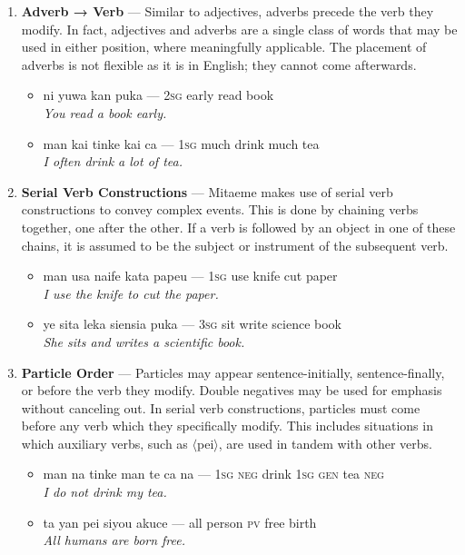 \documentclass[a4paper, titlepage]{article}
\begin{document}
\begin{enumerate}
	\begin{itemize}
		\item ni te pueno ca citala — \textsc{2sg} \textsc{gen} good tea cold\\\textit{Your good tea is cold.}
		\item ni te ca ke man tinke pueno — \textsc{2sg gen} tea \textsc{rel 1sg} drink good\\\textit{Your tea I am drinking is good.}
	\end{itemize}
	\item \textbf{Adverb → Verb} — Similar to adjectives, adverbs precede the verb they modify. In fact, adjectives and adverbs are a single class of words that may be used in either position, where meaningfully applicable. The placement of adverbs is not flexible as it is in English; they cannot come afterwards.
	\begin{itemize}
		\item ni yuwa kan puka — \textsc{2sg} early read book\\\textit{You read a book early.}
		\item man kai tinke kai ca — \textsc{1sg} much drink much tea\\\textit{I often drink a lot of tea.}
	\end{itemize}
	\item \textbf{Serial Verb Constructions} — Mitaeme makes use of serial verb constructions to convey complex events. This is done by chaining verbs together, one after the other. If a verb is followed by an object in one of these chains, it is assumed to be the subject or instrument of the subsequent verb.
	\begin{itemize}
		\item man usa naife kata papeu — \textsc{1sg} use knife cut paper\\\textit{I use the knife to cut the paper.}
		\item ye sita leka siensia puka — \textsc{3sg} sit write science book\\\textit{She sits and writes a scientific book.}
	\end{itemize}
	\item \textbf{Particle Order} — Particles may appear sentence-initially, sentence-finally, or before the verb they modify. Double negatives may be used for emphasis without canceling out. In serial verb constructions, particles must come before any verb which they specifically modify. This includes situations in which auxiliary verbs, such as $\langle$pei$\rangle$, are used in tandem with other verbs.
	\begin{itemize}
		\item man na tinke man te ca na — \textsc{1sg} \textsc{neg} drink \textsc{1sg} \textsc{gen} tea \textsc{neg}\\\textit{I do not drink my tea.}
		\item ta yan pei siyou akuce — all person \textsc{pv} free birth\\\textit{All humans are born free.}
	\end{itemize}
\end{enumerate}
\end{document}
